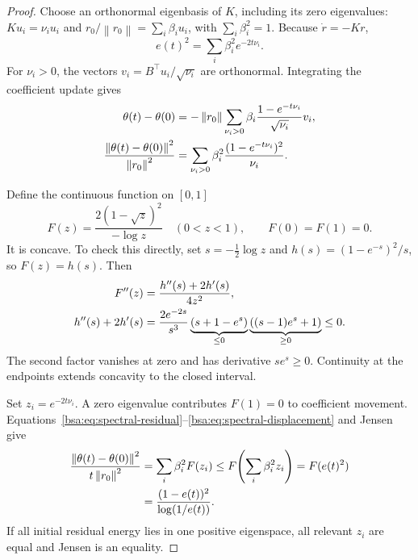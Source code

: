 \documentclass[11pt,letterpaper]{article}
\newcommand{\bsaNorm}[1]{\left\lVert #1\right\rVert}
\theoremstyle{remark}
\theoremstyle{plain}
\begin{document}
\begin{proof}
Choose an orthonormal eigenbasis of $K$, including its zero eigenvalues:
$Ku_i=\nu_i u_i$ and $r_0/\bsaNorm{r_0}=\sum_i\beta_i u_i$, with $\sum_i\beta_i^2=1$.
Because $\dot r=-Kr$,
\begin{equation}
 e(t)^2=\sum_i\beta_i^2e^{-2t\nu_i}.
 \label{bsa:eq:spectral-residual}
\end{equation}
For $\nu_i>0$, the vectors $v_i=B^\top u_i/\sqrt{\nu_i}$ are orthonormal. Integrating the coefficient update gives
\begin{align}
 \theta(t)-\theta(0)
 &=-\bsaNorm{r_0}\sum_{\nu_i>0}\beta_i
 \frac{1-e^{-t\nu_i}}{\sqrt{\nu_i}}v_i,\notag\\
 \frac{\bsaNorm{\theta(t)-\theta(0)}^2}{\bsaNorm{r_0}^2}
 &=\sum_{\nu_i>0}\beta_i^2\frac{(1-e^{-t\nu_i})^2}{\nu_i}.
 \label{bsa:eq:spectral-displacement}
\end{align}

Define the continuous function on $[0,1]$
\begin{equation}
 F(z)=\frac{2(1-\sqrt z)^2}{-\log z}\quad(0<z<1),
 \qquad F(0)=F(1)=0.
 \label{bsa:eq:concave-function}
\end{equation}
It is concave. To check this directly, set $s=-\tfrac12\log z$ and $h(s)=(1-e^{-s})^2/s$, so $F(z)=h(s)$. Then
\begin{align}
 F''(z)&=\frac{h''(s)+2h'(s)}{4z^2},\notag\\
 h''(s)+2h'(s)
 &=\frac{2e^{-2s}}{s^3}
 \underbrace{(s+1-e^s)}_{\le0}
 \underbrace{((s-1)e^s+1)}_{\ge0}\le0.
 \label{bsa:eq:concavity-proof}
\end{align}
The second factor vanishes at zero and has derivative $se^s\ge0$. Continuity at the endpoints extends concavity to the closed interval.

Set $z_i=e^{-2t\nu_i}$. A zero eigenvalue contributes $F(1)=0$ to coefficient movement. Equations~\eqref{bsa:eq:spectral-residual}--\eqref{bsa:eq:spectral-displacement} and Jensen give
\begin{align}
 \frac{\bsaNorm{\theta(t)-\theta(0)}^2}{t\bsaNorm{r_0}^2}
 &=\sum_i\beta_i^2F(z_i)
 \le F\!\left(\sum_i\beta_i^2z_i\right)
 =F(e(t)^2)\notag\\
 &=\frac{(1-e(t))^2}{\log(1/e(t))}.
\end{align}
If all initial residual energy lies in one positive eigenspace, all relevant $z_i$ are equal and Jensen is an equality.
\end{proof}
\end{document}
